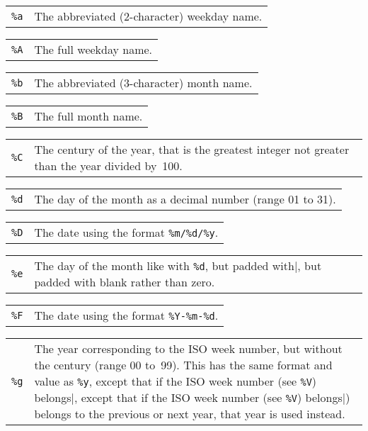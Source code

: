 \documentclass[11pt]{report}
\begin{document}
\begin{tabular}{@{}p{20pt}p{421.5pt}@{}}
{\tt\%a}&The abbreviated (2-character) weekday name.\\
\end{tabular}

\begin{tabular}{@{}p{20pt}p{421.5pt}@{}}
{\tt\%A}&The full weekday name.\\
\end{tabular}

\begin{tabular}{@{}p{20pt}p{421.5pt}@{}}
{\tt\%b}&The abbreviated (3-character) month name.\\
\end{tabular}

\begin{tabular}{@{}p{20pt}p{421.5pt}@{}}
{\tt\%B}&The full month name.\\
\end{tabular}

\begin{tabular}{@{}p{20pt}p{421.5pt}@{}}
{\tt\%C}&The century of the year, that is the greatest integer not
greater than the year divided by~100.\\
\end{tabular}

\begin{tabular}{@{}p{20pt}p{421.5pt}@{}}
{\tt\%d}&The day of the month as a decimal number (range 01 to 31).\\
\end{tabular}

\begin{tabular}{@{}p{20pt}p{421.5pt}@{}}
{\tt\%D}&The date using the format \verb|%m/%d/%y|.\\
\end{tabular}

\begin{tabular}{@{}p{20pt}p{421.5pt}@{}}
{\tt\%e}&The day of the month like with \verb|%d|, but padded with
blank rather than zero.\\
\end{tabular}

\begin{tabular}{@{}p{20pt}p{421.5pt}@{}}
{\tt\%F}&The date using the format \verb|%Y-%m-%d|.\\
\end{tabular}

\begin{tabular}{@{}p{20pt}p{421.5pt}@{}}
{\tt\%g}&The year corresponding to the ISO week number, but without the
century (range 00 to~99). This has the same format and value as
\verb|%y|, except that if the ISO week number (see \verb|%V|) belongs
to the previous or next year, that year is used instead.\\
\end{tabular}
\end{document}
